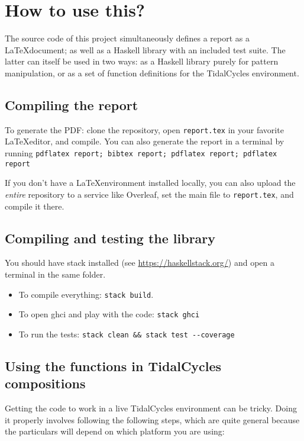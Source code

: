 
\section{How to use this?}

The source code of this project simultaneously defines
a report as a \LaTeX document;
as well as a Haskell library with an included test suite.
The latter can itself be used in two ways:
as a Haskell library purely for pattern manipulation,
or as a set of function definitions for the TidalCycles environment.

\subsection{Compiling the report}

To generate the PDF: clone the repository, open \texttt{report.tex} in your favorite \LaTeX editor, and compile.
You can also generate the report in a terminal by running
\texttt{pdflatex report; bibtex report; pdflatex report; pdflatex report}

If you don't have a \LaTeX environment installed locally, you can also upload the \emph{entire} repository to a service like Overleaf, set the main file to \texttt{report.tex}, and compile it there.

\subsection{Compiling and testing the library}

You should have stack installed (see \url{https://haskellstack.org/}) and
open a terminal in the same folder.

\begin{itemize}
  \item To compile everything: \verb|stack build|.
  \item To open ghci and play with the code: \verb|stack ghci|
  \item To run the tests: \verb|stack clean && stack test --coverage|
\end{itemize}

\subsection{Using the functions in TidalCycles compositions}

Getting the code to work in a live TidalCycles environment can be tricky.
Doing it properly involves following the following steps, which are quite general because the particulars will depend on which platform you are using:


